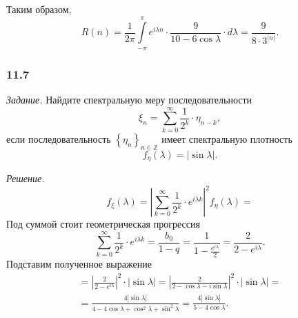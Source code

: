 Таким образом,
\begin{equation*}
  R \left( n \right) =
  \frac{1}{2 \pi }
  \int \limits_{-\pi }^{ \pi } e^{i \lambda n} \cdot \frac{9}{10 - 6 \cos \lambda} \cdot d \lambda =
  \frac{9}{8 \cdot 3^{ \left| n \right| }}.
\end{equation*}

\subsubsection*{11.7}

\textit{Задание.}
Найдите спектральную меру последовательности
\begin{equation*}
  \xi_n =
  \sum \limits_{k = 0}^{ \infty } \frac{1}{2^k} \cdot \eta_{n - k},
\end{equation*}
если последовательность $ \left\{ \eta_n \right\}_{n \in \mathbb{Z}}$
имеет спектральную плотность
\begin{equation*}
  f_{ \eta } \left( \lambda \right) =
  \left| \sin \lambda \right|.
\end{equation*}

\textit{Решение.}
\begin{equation*}
  f_{ \xi } \left( \lambda \right) =
  \left|
    \sum \limits_{k = 0}^{ \infty } \frac{1}{2^k} \cdot e^{i \lambda k}
  \right|^2 f_{ \eta } \left( \lambda \right) =
\end{equation*}
Под суммой стоит геометрическая прогрессия
\begin{equation*}
  \sum \limits_{k = 0}^{ \infty } \frac{1}{2^k} \cdot e^{i \lambda k} =
  \frac{b_0}{1 - q} =
  \frac{1}{1 - \frac{e^{i \lambda }}{2}} =
  \frac{2}{2 - e^{i \lambda }}.
\end{equation*}
Подставим полученное выражение
\begin{gather*}
  = \left| \frac{2}{2 - e^{i \lambda }} \right|^2 \cdot
  \left| \sin \lambda \right| =
  \left| \frac{2}{2 - \cos \lambda - i \sin \lambda } \right|^2 \cdot
  \left| \sin \lambda \right| = \\
  = \frac{4 \left| \sin \lambda \right| }{4 - 4 \cos \lambda + \cos^2 \lambda + \sin^2 \lambda } =
  \frac{4 \left| \sin \lambda \right| }{5 - 4 \cos \lambda }.
\end{gather*}
